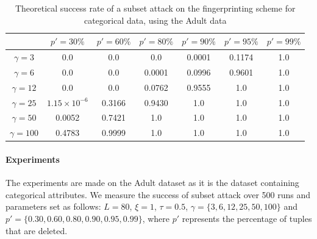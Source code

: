 \begin{table}[ht]
    \centering
    \caption{Theoretical success rate of a subset attack on the fingerprinting scheme for categorical data, using the Adult data}
    \label{tab:subset-attack-adult}
    \begin{tabular}{|c|c|c|c|c|c|c|}
         \hline
        & \textbf{$p'=30\%$} & \textbf{$p'=60\%$} & \textbf{$p'=80\%$} & \textbf{$p'=90\%$} & \textbf{$p'=95\%$} & \textbf{$p'=99\%$}\\
        \hline
        $\gamma=3$ & 0.0 & 0.0 & 0.0 & 0.0001 & 0.1174 & 1.0 \\
        \hline
        $\gamma=6$ & 0.0 & 0.0 & 0.0001 & 0.0996 & 0.9601 & 1.0 \\
        \hline
        $\gamma=12$ & 0.0 & 0.0 & 0.0762 & 0.9555 & 1.0 & 1.0 \\
        \hline
        $\gamma=25$ & $1.15\times10^{-6}$ & 0.3166 & 0.9430 & 1.0 & 1.0 & 1.0 \\
        \hline
        $\gamma=50$ & 0.0052 & 0.7421 & 1.0 & 1.0 & 1.0 & 1.0 \\
         \hline
        $\gamma=100$ & 0.4783 & 0.9999 & 1.0 & 1.0 & 1.0 & 1.0 \\
         \hline
     \end{tabular}
\end{table}

\paragraph{Experiments}
The experiments are made on the Adult dataset as it is the dataset containing categorical attributes. 
We measure the success of subset attack over 500 runs and parameters set as follows: $L=80$, $\xi=1$, $\tau=0.5$, $\gamma=\{3,6,12,25,50,100\}$ and $p'=\{0.30,0.60,0.80,0.90,0.95,0.99\}$, where $p'$ represents the percentage of tuples that are deleted.


